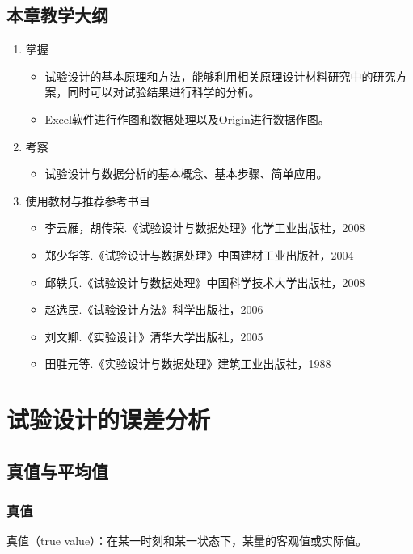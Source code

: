 \documentclass[UTF8]{ctexart}
\begin{document}
\subsection{本章教学大纲}
\begin{enumerate}[•]
\item 掌握
\begin{itemize}
\item 试验设计的基本原理和方法，能够利用相关原理设计材料研究中的研究方案，同时可以对试验结果进行科学的分析。
\item Excel软件进行作图和数据处理以及Origin进行数据作图。
\end{itemize}
\item 考察
\begin{itemize}
\item 试验设计与数据分析的基本概念、基本步骤、简单应用。
\end{itemize}
\item 使用教材与推荐参考书目
\begin{itemize}
\item 李云雁，胡传荣.《试验设计与数据处理》化学工业出版社，2008
\item 郑少华等.《试验设计与数据处理》中国建材工业出版社，2004
\item 邱轶兵.《试验设计与数据处理》中国科学技术大学出版社，2008
\item 赵选民.《试验设计方法》科学出版社，2006
\item 刘文卿.《实验设计》清华大学出版社，2005
\item 田胜元等.《实验设计与数据处理》建筑工业出版社，1988
\end{itemize}
\end{enumerate}

\newpage
\setcounter{equation}{0}

\chead{}			%
\lfoot{}			%
\cfoot{\thepage}			%
\rfoot{}			%
\clearpage   


\section{试验设计的误差分析}
\subsection{真值与平均值}
\subsubsection{真值}
\par 真值（true value）：在某一时刻和某一状态下，某量的客观值或实际值。
\end{document}
